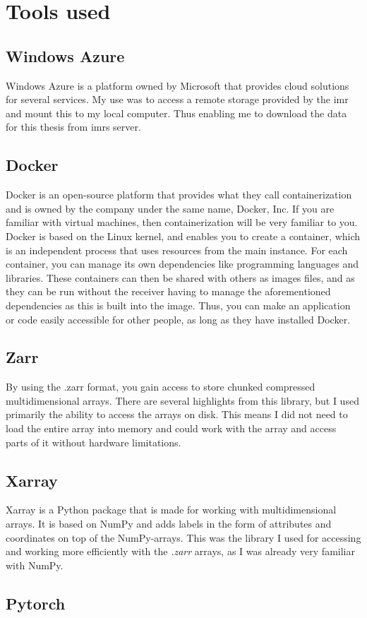 \chapter{Tools used}

    \section{Windows Azure} \label{Windows Azure}
        Windows Azure \cite{azure} is a platform owned by Microsoft that provides cloud solutions for several services. My use was to access a remote storage provided by the \gls{imr} and mount this to my local computer. Thus enabling me to download the data for this thesis from \gls{imr}s server. 
    
    \section{Docker} \label{Docker}
        Docker \cite{docker} is an open-source platform that provides what they call containerization and is owned by the company under the same name, Docker, Inc. If you are familiar with virtual machines, then containerization will be very familiar to you. Docker is based on the Linux kernel, and enables you to create a container, which is an independent process that uses resources from the main instance. For each container, you can manage its own dependencies like programming languages and libraries. These containers can then be shared with others as images files, and as they can be run without the receiver having to manage the aforementioned dependencies as this is built into the image. Thus, you can make an application or code easily accessible for other people, as long as they have installed Docker.
        
    \section{Zarr} \label{Zarr}
        By using the .zarr \cite{zarr} format, you gain access to store chunked compressed  multidimensional arrays. There are several highlights from this library, but I used primarily the ability to access the arrays on disk. This means I did not need to load the entire array into memory and could work with the array and access parts of it without hardware limitations.
        

    \section{Xarray} \label{Xarray}
        Xarray\cite{xarray} is a Python package that is made for working with multidimensional arrays. It is based on NumPy and adds labels in the form of attributes and coordinates on top of the NumPy-arrays. This was the library I used for accessing and working more efficiently with the \textit{.zarr} arrays, as I was already very familiar with NumPy.
        
        
    \section{Pytorch} \label{Pytorch}